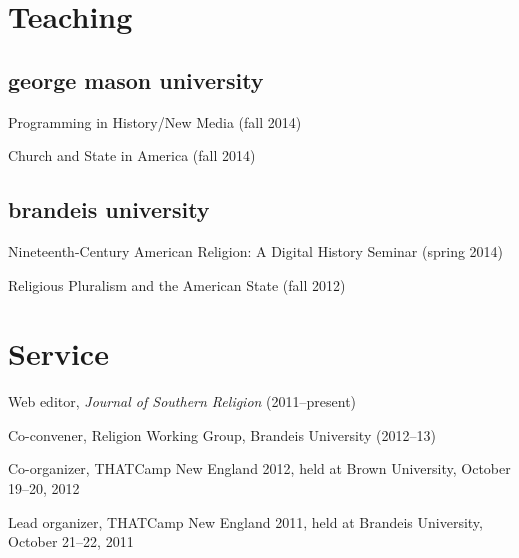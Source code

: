 \documentclass[11pt]{article}
\begin{document}
  \section{Teaching}

  \subsection{george mason university}

  Programming in History/New Media (fall 2014)

  Church and State in America (fall 2014)

  \subsection{brandeis university}

  Nineteenth-Century American Religion: A Digital History Seminar (spring 
  2014)

  Religious Pluralism and the American State (fall 2012)








  \section{Service}

  Web editor, \emph{Journal of Southern Religion} (2011--present)

  Co-convener, Religion Working Group, Brandeis University (2012--13)

  Co-organizer, THATCamp New England 2012, held at Brown University,
  October 19--20, 2012

  Lead organizer, THATCamp New England 2011, held at Brandeis University, 
  October 21--22, 2011
\end{document}

